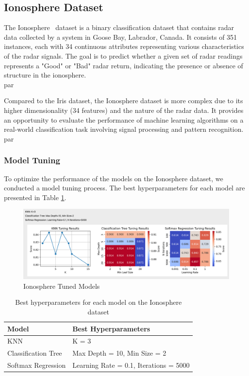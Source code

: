 \documentclass[letterpaper,10pt]{article}
\begin{document}
\subsection{Ionosphere Dataset}

The Ionosphere~\cite{ionosphere} dataset is a binary classification dataset that contains radar data collected by a system in Goose Bay, Labrador, Canada. It consists of 351 instances, each with 34 continuous attributes representing various characteristics of the radar signals. The goal is to predict whether a given set of radar readings represents a "Good" or "Bad" radar return, indicating the presence or absence of structure in the ionosphere. \\par

Compared to the Iris dataset, the Ionosphere dataset is more complex due to its higher dimensionality (34 features) and the nature of the radar data. It provides an opportunity to evaluate the performance of machine learning algorithms on a real-world classification task involving signal processing and pattern recognition. \\par

\subsubsection{Model Tuning}

To optimize the performance of the models on the Ionosphere dataset, we conducted a model tuning process. The best hyperparameters for each model are presented in Table \ref{tab:ionosphere_tuning}.

\begin{figure}[ht]
    \centering
    \includegraphics[width=1.0\textwidth]{iono_tuned.png}
    \caption{Ionosphere Tuned Models}
    \label{iono_tuned}
\end{figure}

\begin{table}[ht]
\centering
\caption{Best hyperparameters for each model on the Ionosphere dataset}
\label{tab:ionosphere_tuning}
\begin{tabular}{|l|l|}
\hline
\textbf{Model} & \textbf{Best Hyperparameters} \\
\hline
KNN & K = 3 \\
\hline
Classification Tree & Max Depth = 10, Min Size = 2 \\
\hline
Softmax Regression & Learning Rate = 0.1, Iterations = 5000 \\
\hline
\end{tabular}
\end{table}
\end{document}
